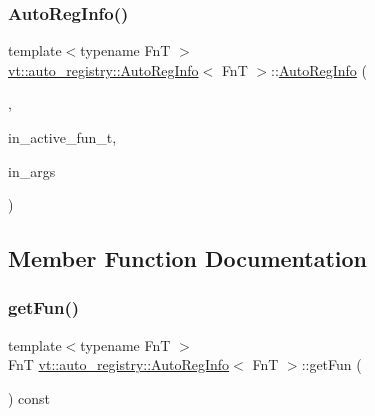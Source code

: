 \mbox{\label{structvt_1_1auto__registry_1_1_auto_reg_info_a30060ab05ce35a6b8c3bd2d5d23e995f}} 
\subsubsection{\texorpdfstring{Auto\+Reg\+Info()}{AutoRegInfo()}\hspace{0.1cm}{\footnotesize\ttfamily [2/2]}}
{\footnotesize\ttfamily template$<$typename FnT $>$ \\
\hyperlink{structvt_1_1auto__registry_1_1_auto_reg_info}{vt\+::auto\+\_\+registry\+::\+Auto\+Reg\+Info}$<$ FnT $>$\+::\hyperlink{structvt_1_1auto__registry_1_1_auto_reg_info}{Auto\+Reg\+Info} (\begin{DoxyParamCaption}\item[{Num\+Args\+Tag\+Type}]{,  }\item[{FnT const \&}]{in\+\_\+active\+\_\+fun\+\_\+t,  }\item[{\hyperlink{namespacevt_1_1auto__registry_aebda1d9d765bc9147dc654ad0712c936}{Num\+Args\+Type} const \&}]{in\+\_\+args }\end{DoxyParamCaption})\hspace{0.3cm}{\ttfamily [inline]}}



\subsection{Member Function Documentation}
\mbox{\label{structvt_1_1auto__registry_1_1_auto_reg_info_ae03a0d6a163e158771fbb28b0ba8dd62}} 
\subsubsection{\texorpdfstring{get\+Fun()}{getFun()}}
{\footnotesize\ttfamily template$<$typename FnT $>$ \\
FnT \hyperlink{structvt_1_1auto__registry_1_1_auto_reg_info}{vt\+::auto\+\_\+registry\+::\+Auto\+Reg\+Info}$<$ FnT $>$\+::get\+Fun (\begin{DoxyParamCaption}{ }\end{DoxyParamCaption}) const\hspace{0.3cm}{\ttfamily [inline]}}

